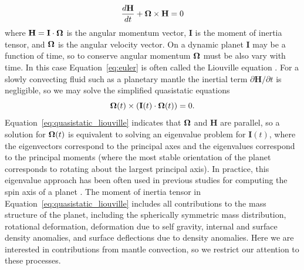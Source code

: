 \documentclass[extra,mreferee]{gji}
\begin{document}
\begin{equation}
\frac{d \mathbf{H}}{dt} + \mitbf{\Omega} \times \mathbf{H} = 0
\label{eq:euler}
\end{equation}
where $\mathbf{H} = \mathbf{I} \cdot \mitbf{\Omega}$ is the angular momentum vector, $\mathbf{I}$ is the moment of inertia tensor, and $\mitbf{\Omega}$ is the angular velocity vector.
On a dynamic planet $\mathbf{I}$ may be a function of time, so to conserve angular momentum $\mitbf{\Omega}$ must be also vary with time.
In this case Equation~\eqref{eq:euler} is often called the Liouville equation \citep[e.g.][]{munk1960rotation}.
For a slowly convecting fluid such as a planetary mantle the inertial term $\partial \mathbf{H} / \partial t$ is negligible, so we may solve the simplified quasistatic equations
\begin{equation}
\mitbf{\Omega } (t)\times ( \mathbf{I}(t) \cdot \mitbf{\Omega }(t) ) = 0.
\label{eq:quasistatic_liouville}
\end{equation}
Equation~\eqref{eq:quasistatic_liouville} indicates that $\mitbf{\Omega}$ and $\mathbf{H}$ are parallel, so a solution for $\mitbf{\Omega}(t)$ is equivalent to solving an eigenvalue problem for $\mathbf{I}(t)$, where the eigenvectors correspond to the principal axes and the eigenvalues correspond to the principal moments (where the most stable orientation of the planet corresponds to rotating about the largest principal axis).
In practice, this eigenvalue approach has been often used in previous studies for computing the spin axis of a planet \citep[e.g.][]{steinberger1997changes, roberts2007cause}.
The moment of inertia tensor in Equation~\eqref{eq:quasistatic_liouville} includes all contributions to the mass structure
of the planet, including the spherically symmetric mass distribution, rotational deformation, deformation due to self gravity, internal and surface density anomalies, and surface deflections due to density anomalies.
Here we are interested in contributions from mantle convection, so we restrict our attention to these processes.
\end{document}
